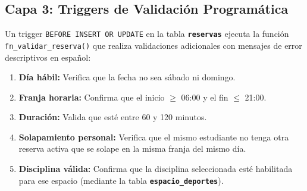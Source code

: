 \documentclass[12pt, a4paper]{article}
\newcommand{\tname}[1]{\texttt{\textbf{#1}}}
\begin{document}
\subsection{Capa 3: Triggers de Validación Programática}

Un trigger \texttt{BEFORE INSERT OR UPDATE} en la tabla \tname{reservas} ejecuta la función \texttt{fn\_validar\_reserva()} que realiza validaciones adicionales con mensajes de error descriptivos en español:

\begin{enumerate}[leftmargin=2em]
    \item \textbf{Día hábil:} Verifica que la fecha no sea sábado ni domingo.
    \item \textbf{Franja horaria:} Confirma que el inicio $\geq$ 06:00 y el fin $\leq$ 21:00.
    \item \textbf{Duración:} Valida que esté entre 60 y 120 minutos.
    \item \textbf{Solapamiento personal:} Verifica que el mismo estudiante no tenga otra reserva activa que se solape en la misma franja del mismo día.
    \item \textbf{Disciplina válida:} Confirma que la disciplina seleccionada esté habilitada para ese espacio (mediante la tabla \tname{espacio\_deportes}).
\end{enumerate}
\end{document}
